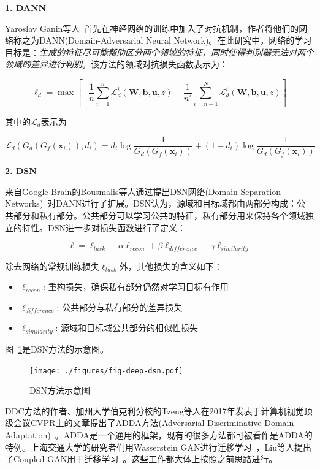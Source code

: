 \textbf{1. DANN}

Yaroslav Ganin等人~\cite{ganin2016domain}首先在神经网络的训练中加入了对抗机制，作者将他们的网络称之为DANN(Domain-Adversarial Neural Network)。在此研究中，网络的学习目标是：\textit{生成的特征尽可能帮助区分两个领域的特征，同时使得判别器无法对两个领域的差异进行判别}。该方法的领域对抗损失函数表示为：

\begin{equation}
	\ell_d = \max \left[-\frac{1}{n} \sum_{i=1}^{n} \mathcal{L}^i_d(\mathbf{W},\mathbf{b},\mathbf{u},z) - \frac{1}{n'} \sum_{i=n+1}^{N} \mathcal{L}^i_d(\mathbf{W},\mathbf{b},\mathbf{u},z)\right]
\end{equation}

其中的$\mathcal{L}_d$表示为

\begin{equation}
	\mathcal{L}_d(G_d(G_f(\mathbf{x}_i)),d_i) = d_i \log \frac{1}{G_d(G_f(\mathbf{x}_i))} + (1 - d_i) \log \frac{1}{G_d(G_f(\mathbf{x}_i))}
\end{equation}

\textbf{2. DSN}

来自Google Brain的Bousmalis等人通过提出DSN网络(Domain Separation Networks)~\cite{bousmalis2016domain}对DANN进行了扩展。DSN认为，源域和目标域都由两部分构成：公共部分和私有部分。公共部分可以学习公共的特征，私有部分用来保持各个领域独立的特性。DSN进一步对损失函数进行了定义：

\begin{equation}
	\ell = \ell_{task} + \alpha \ell_{recon} + \beta \ell_{difference} + \gamma \ell_{similarity}
\end{equation}

除去网络的常规训练损失$\ell_{task}$外，其他损失的含义如下：
\begin{itemize}
	\item $\ell_{recon}$: 重构损失，确保私有部分仍然对学习目标有作用
	\item $\ell_{difference}$: 公共部分与私有部分的差异损失
	\item $\ell_{similarity}$: 源域和目标域公共部分的相似性损失
\end{itemize}

图~\ref{fig-deep-dsn}是DSN方法的示意图。

\begin{figure}[htbp]
	\centering
	\texttt{[image: ./figures/fig-deep-dsn.pdf]}
	\caption{DSN方法示意图}
	\label{fig-deep-dsn}
\end{figure}

DDC方法的作者、加州大学伯克利分校的Tzeng等人在2017年发表于计算机视觉顶级会议CVPR上的文章提出了ADDA方法(Adversarial Discriminative Domain Adaptation)~\cite{tzeng2017adversarial}。ADDA是一个通用的框架，现有的很多方法都可被看作是ADDA的特例。上海交通大学的研究者们用Wasserstein GAN进行迁移学习~\cite{shen2018w}，Liu等人提出了Coupled GAN用于迁移学习~\cite{liu2016coupled}。这些工作都大体上按照之前思路进行。

